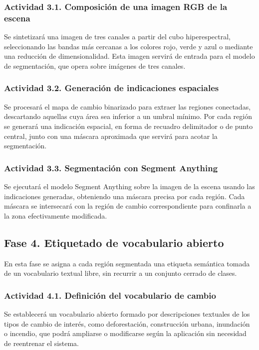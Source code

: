 \documentclass[12pt,onecolumn]{IEEEtran}
\begin{document}
\subsubsection{{Actividad 3.1. Composición de una imagen RGB de la escena}}

Se sintetizará una imagen de tres canales a partir del cubo hiperespectral, seleccionando las bandas más cercanas a los colores rojo, verde y azul o mediante una reducción de dimensionalidad. Esta imagen servirá de entrada para el modelo de segmentación, que opera sobre imágenes de tres canales.

\subsubsection{{Actividad 3.2. Generación de indicaciones espaciales}}

Se procesará el mapa de cambio binarizado para extraer las regiones conectadas, descartando aquellas cuya área sea inferior a un umbral mínimo. Por cada región se generará una indicación espacial, en forma de recuadro delimitador o de punto central, junto con una máscara aproximada que servirá para acotar la segmentación.

\subsubsection{{Actividad 3.3. Segmentación con Segment Anything}}

Se ejecutará el modelo Segment Anything sobre la imagen de la escena usando las indicaciones generadas, obteniendo una máscara precisa por cada región. Cada máscara se intersecará con la región de cambio correspondiente para confinarla a la zona efectivamente modificada.

\subsection{{Fase 4. Etiquetado de vocabulario abierto}}
En esta fase se asigna a cada región segmentada una etiqueta semántica tomada de un vocabulario textual libre, sin recurrir a un conjunto cerrado de clases.

\subsubsection{{Actividad 4.1. Definición del vocabulario de cambio}}

Se establecerá un vocabulario abierto formado por descripciones textuales de los tipos de cambio de interés, como deforestación, construcción urbana, inundación o incendio, que podrá ampliarse o modificarse según la aplicación sin necesidad de reentrenar el sistema.
\end{document}
